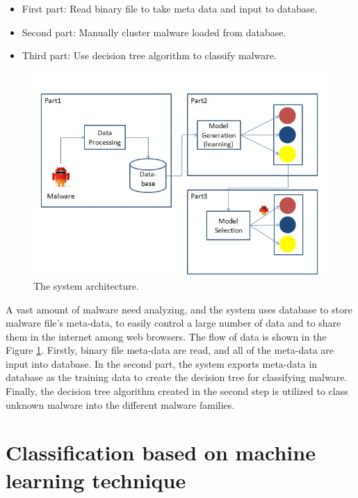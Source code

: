 \begin{itemize}
\item First part: Read binary file to take meta data and input to database.
\item Second part: Manually cluster malware loaded from database.
\item Third part: Use decision tree algorithm to classify malware.
\end{itemize}
\begin{figure}[h!]
\centering
\includegraphics[width=1\textwidth]
{graph/system_architec.jpg}
\caption{The system architecture.}
\label{fig:system_architec}
\end{figure}

A vast amount of malware need analyzing, and the system uses database to store malware file's meta-data, to easily control a large number of data and to share them in the internet among web browsers.
The flow of data is shown in the Figure \ref{fig:system_architec}. Firstly, binary file meta-data are read, and all of the meta-data are input into database. In the second part, the system exports meta-data in database as the training data to create the decision tree for classifying malware. Finally, the decision tree algorithm created in the second step is utilized to class  unknown malware into the different malware families. 
%
%
\section{Classification based on machine learning technique} 
